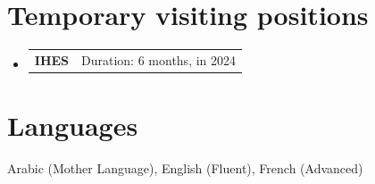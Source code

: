\documentclass[A4,11pt]{article}
\makeatletter
\newcommand{\CVSubheading}[4]{
  \vspace{-2pt}\item
    \begin{tabular*}{0.97\textwidth}[t]{l@{\extracolsep{\fill}}r}
      \textbf{#1} & #2 \\
      \small#3 & \small #4 \\
    \end{tabular*}\vspace{-7pt}
}
\newcommand{\CVSubheadingshort}[2]{
  \vspace{-2pt}\item
    \begin{tabular*}{0.97\textwidth}[t]{l@{\extracolsep{\fill}}r}
      \textbf{#1} & #2 \\
    \end{tabular*}\vspace{-7pt}
}
\newcommand{\CVSubHeadingListStart}{\begin{itemize}[leftmargin=0.5cm, label={}]}
\newcommand{\CVSubHeadingListEnd}{\end{itemize}}
\makeatother
\begin{document}
\section{Temporary visiting positions}
   \CVSubHeadingListStart
   \CVSubheadingshort
        {IHES}{Duration: 6 months, in 2024}
     \CVSubHeadingListEnd
  

\section{Languages}
 \begin{itemize}[leftmargin=0.5cm, label={}]
    \small{\item{
     Arabic (Mother Language), English (Fluent), French (Advanced) \\
    }}
 \end{itemize}
    
\end{document}
